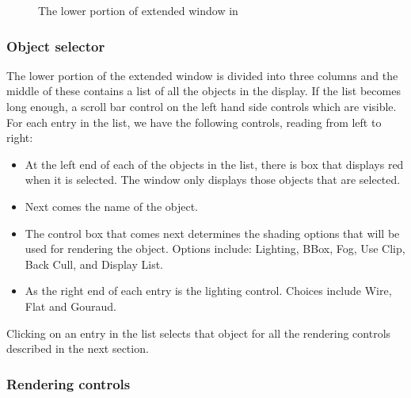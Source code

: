 \begin{figure}[htb]
  \begin{makeimage}
  \end{makeimage}
  \caption{\label{fig:extviewwindow} The lower portion of extended
    \viewer{} window in \SR{}} 
\end{figure}


\subsubsection{Object selector}

The lower portion of the extended \viewer{} window is divided into three
columns and the middle of these contains a list of all the objects in the
display.  If the list becomes long enough, a scroll bar control on the left
hand side controls which are visible.  For each entry in the list, we have
the following controls, reading from left to right:

\begin{itemize}
  \item At the left end of each of the
        objects in the list, there is box that displays red when it is
        selected.  The \viewer{} window only displays those objects that
        are selected.
  \item Next comes the name of the object.
  \item The control box that comes next determines the shading options
        that will be used for rendering the object.  Options include:
        Lighting, BBox, Fog, Use Clip, Back Cull, and Display List.
  \item As the right end of each entry is the lighting control.
        Choices include Wire, Flat and Gouraud.
\end{itemize}

Clicking on an entry in the list selects that object for all the rendering
controls described in the next section.

\subsubsection{Rendering controls}

